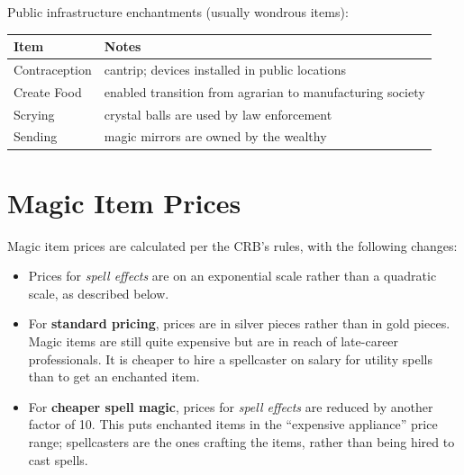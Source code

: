 Public infrastructure enchantments (usually wondrous items):

\begin{tabular}{ll} \hline
\textbf{Item} & \textbf{Notes} \\ \hline
Contraception & cantrip; devices installed in public locations \\
Create Food & enabled transition from agrarian to manufacturing society \\
Scrying & crystal balls are used by law enforcement \\
Sending & magic mirrors are owned by the wealthy \\
\hline
\end{tabular}
%

%
\section{Magic Item Prices}

Magic item prices are calculated per the CRB's rules, with the following
changes:
\begin{itemize}
%
\item Prices for \textit{spell effects} are on an exponential scale rather
than a quadratic scale, as described below.
%
\item For \textbf{standard pricing}, prices are in silver pieces rather than
in gold pieces. Magic items are still quite expensive but are in reach of
late-career professionals. It is cheaper to hire a spellcaster on salary for
utility spells than to get an enchanted item.
%
\item For \textbf{cheaper spell magic}, prices for \textit{spell effects}
are reduced by another factor of 10. This puts enchanted items in the
``expensive appliance'' price range; spellcasters are the ones crafting the
items, rather than being hired to cast spells.
%
\end{itemize}

